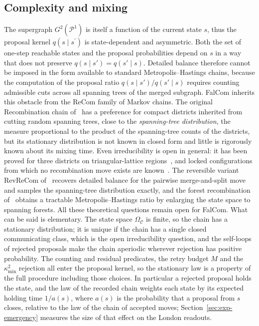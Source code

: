 \documentclass[preprint,12pt,authoryear]{elsarticle}
\theoremstyle{definition}
\begin{document}
\subsection{Complexity and mixing}
\label{sec:convergence-status}

The supergraph $G^2(\mathcal{P}^1)$ is itself a function of the current state $s$, thus the proposal kernel $q(s \mid s^\prime)$ is state-dependent and asymmetric. Both the set of one-step reachable states and the proposal probabilities depend on $s$ in a way that does not preserve $q(s \mid s') = q(s' \mid s)$. Detailed balance therefore cannot be imposed in the form available to standard Metropolis--Hastings chains, because the computation of the proposal ratio $q(s \mid s') / q(s' \mid s)$ requires counting admissible cuts across all spanning trees of the merged subgraph. FalCom inherits this obstacle from the ReCom family of Markov chains. The original Recombination chain
of~\citet{deford2021recombination} has a preference for compact districts inherited from cutting random spanning trees, close to the \emph{spanning-tree distribution}, the measure proportional to the product of the spanning-tree counts of the districts, but its stationary distribution is not known in closed form and little is rigorously known about its mixing time. Even irreducibility is open in general: it has been proved for three districts on triangular-lattice regions~\citep{cannon2024irreducibility}, and locked configurations from which no recombination move exists are known~\citep{akitaya2026balanced}. The reversible variant RevReCom of~\citet{cannon2026spanning} recovers detailed balance for the pairwise merge-and-split move and samples the spanning-tree distribution exactly, and the forest recombination of~\citet{autry2023forest} obtains a tractable Metropolis--Hastings ratio by enlarging the state space to spanning forests. All these theoretical questions remain open for FalCom. What can be said is elementary. The state space $\Omega_\mathcal{C}$ is finite, so the chain has a stationary distribution; it is unique if the chain has a single closed communicating class, which is the open irreducibility question, and the self-loops of rejected proposals make the chain aperiodic wherever rejection has positive probability. The counting and residual predicates, the retry budget $M$ and the $\kappa^2_{\min}$ rejection all enter the proposal kernel, so the stationary law is a property of the full procedure including those choices. In particular a rejected proposal holds the state, and the law of the recorded chain weights each state by its expected holding time $1/a(s)$, where $a(s)$ is the probability that a proposal from $s$ closes, relative to the law of the chain of accepted moves; Section~\ref{sec:exp-emergency} measures the size of that effect on the London readouts.
\end{document}
